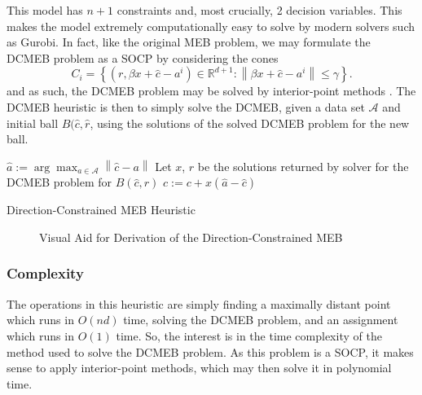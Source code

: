 \documentclass[11pt,twoside]{report}
\newcommand{\A}{\mathcal{A}} %
\newcommand{\norm}[1]{\left\lVert#1\right\rVert} %
\theoremstyle{definition}
\numberwithin{theorem}{section}
\numberwithin{definition}{section}
\numberwithin{lemma}{section}
\numberwithin{proposition}{section}
\numberwithin{equation}{section}
\numberwithin{figure}{section}
\begin{document}
This model has $n+1$ constraints and, most crucially, 2 decision variables. This makes the model extremely computationally easy to solve by modern solvers such as Gurobi. In fact, like the original MEB problem, we may formulate the DCMEB problem as a SOCP by considering the cones
\begin{equation*}
    C_i = \left\{(r,\beta x+\hat{c}-a^i) \in \mathbb{R}^{d+1}: \norm{\beta x +\hat{c}-a^i}\leq\gamma\right\}.
\end{equation*}
and as such, the DCMEB problem may be solved by interior-point methods \cite{socp_ipm}. The DCMEB heuristic is then to simply solve the DCMEB, given a data set $\A$ and initial ball $B(\hat{c},\hat{r}$, using the solutions of the solved DCMEB problem for the new ball.

\begin{algorithm}[H]
    \KwIn{Data set $\A$, Ball $B(\hat{c},\hat{r}$)}
    $\hat{a}:=\arg\max_{a\in\A}\norm{\hat{c}-a}$\;
    Let $x$, $r$ be the solutions returned by solver for the DCMEB problem for $B(\hat{c},\hat{r})$\;
    $c:=c+x(\hat{a}-\hat{c})$\;
    \;
    \caption{Direction-Constrained MEB Heuristic}
\end{algorithm}

\begin{figure}
    \centering
    \caption{Visual Aid for Derivation of the Direction-Constrained MEB}
    \label{fig:dcmeb}
\end{figure}

\subsubsection{Complexity}

The operations in this heuristic are simply finding a maximally distant point which runs in $O(nd)$ time, solving the DCMEB problem, and an assignment which runs in $O(1)$ time. So, the interest is in the time complexity of the method used to solve the DCMEB problem. As this problem is a SOCP, it makes sense to apply interior-point methods, which may then solve it in polynomial time.
\end{document}
